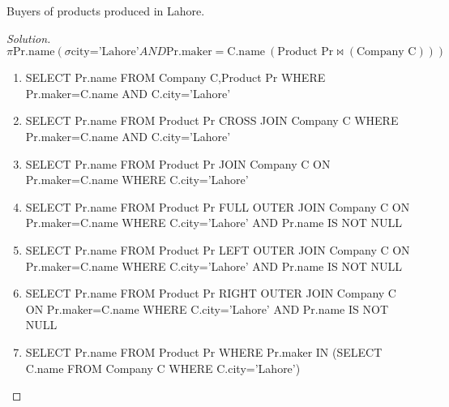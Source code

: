 \documentclass[10pt,a4paper]{article}
\newenvironment{problem}[2][Problem]{\begin{trivlist}
\item[\hskip \labelsep {\bfseries #1}\hskip \labelsep {\bfseries #2.}]}{\end{trivlist}}
\begin{document}
\begin{problem}{5}
Buyers of products produced in Lahore. 
\end{problem}

\begin{proof}[Solution]
\begin{equation*}
\pi \text{Pr.name} (\sigma \text{city='Lahore'} AND \text{Pr.maker} = \text{C.name} \ (\text{Product Pr} \bowtie (\text{Company C})) )
\end{equation*}

\begin{enumerate}
	\item SELECT Pr.name FROM Company C,Product Pr WHERE Pr.maker=C.name AND C.city='Lahore' 
	\item  SELECT Pr.name FROM Product Pr CROSS JOIN Company C WHERE Pr.maker=C.name AND C.city='Lahore'
	\item SELECT Pr.name FROM Product Pr JOIN Company C ON Pr.maker=C.name WHERE C.city='Lahore'
	\item SELECT Pr.name FROM Product Pr FULL OUTER JOIN Company C ON Pr.maker=C.name WHERE C.city='Lahore' AND Pr.name IS NOT NULL
	\item SELECT Pr.name FROM Product Pr LEFT OUTER JOIN Company C ON Pr.maker=C.name WHERE C.city='Lahore' AND Pr.name IS NOT NULL
	\item SELECT Pr.name FROM Product Pr RIGHT OUTER JOIN Company C ON Pr.maker=C.name WHERE C.city='Lahore' AND Pr.name IS NOT NULL
	\item SELECT Pr.name FROM Product Pr WHERE Pr.maker IN (SELECT C.name FROM Company C 	WHERE C.city='Lahore')
\end{enumerate}
\end{proof}
\end{document}
